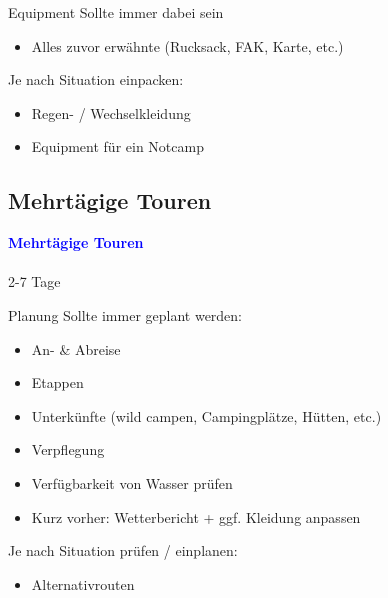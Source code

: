 \documentclass[aspectratio=169]{beamer}
\begin{document}
			\begin{frame}{Equipment}
				Sollte immer dabei sein
				\begin{itemize}
					\item Alles zuvor erwähnte (Rucksack, FAK, Karte, etc.)
				\end{itemize}
				Je nach Situation einpacken:
				\begin{itemize}
					\item Regen- / Wechselkleidung
					\item Equipment für ein Notcamp
				\end{itemize}
			\end{frame}
			
		\subsection{Mehrtägige Touren}
		
			\begin{frame}
				\vspace{1cm}
				\begin{center}
					\textcolor{blue}{\textbf{Mehrtägige Touren}}
					\\\,\\
					{\scriptsize 2-7 Tage}
				\end{center}
			\end{frame}
		
			\begin{frame}{Planung}
				Sollte immer geplant werden:
				\begin{itemize}
					\item An- \& Abreise
					\item Etappen
					\item Unterkünfte (wild campen, Campingplätze, Hütten, etc.)
					\item Verpflegung
					\item Verfügbarkeit von Wasser prüfen
					\item Kurz vorher: Wetterbericht + ggf. Kleidung anpassen
				\end{itemize}
				Je nach Situation prüfen / einplanen:
				\begin{itemize}
					\item Alternativrouten
				\end{itemize}
			\end{frame}
			
\end{document}
